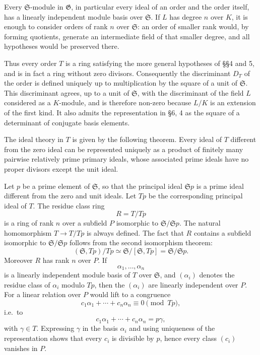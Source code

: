 \documentclass[11pt]{article}
\begin{document}
Every \(\mathfrak S\)-module in \(\mathfrak G\), in particular every
ideal of an order and the order itself, has a linearly independent
module basis over \(\mathfrak S\). If \(L\) has degree \(n\) over \(K\),
it is enough to consider orders of rank \(n\) over \(\mathfrak S\): an
order of smaller rank would, by forming quotients, generate an
intermediate field of that smaller degree, and all hypotheses would be
preserved there.

Thus every order \(T\) is a ring satisfying the more general hypotheses
of §§4 and 5, and is in fact a ring without zero divisors. Consequently
the discriminant \(D_T\) of the order is defined uniquely up to
multiplication by the square of a unit of \(\mathfrak S\). This
discriminant agrees, up to a unit of \(\mathfrak S\), with the
discriminant of the field \(L\) considered as a \(K\)-module, and is
therefore non-zero because \(L/K\) is an extension of the first kind. It
also admits the representation in §6, 4 as the square of a determinant
of conjugate basis elements.

The ideal theory in \(T\) is given by the following theorem. Every ideal
of \(T\) different from the zero ideal can be represented uniquely as a
product of finitely many pairwise relatively prime primary ideals, whose
associated prime ideals have no proper divisors except the unit ideal.

Let \(p\) be a prime element of \(\mathfrak S\), so that the principal
ideal \(\mathfrak S p\) is a prime ideal different from the zero and
unit ideals. Let \(Tp\) be the corresponding principal ideal of \(T\).
The residue class ring \[
  R=T/Tp
\] is a ring of rank \(n\) over a subfield \(P\) isomorphic to
\(\mathfrak S/\mathfrak S p\). The natural homomorphism \(T\to T/Tp\) is
always defined. The fact that \(R\) contains a subfield isomorphic to
\(\mathfrak S/\mathfrak S p\) follows from the second isomorphism
theorem: \[
  (\mathfrak S,Tp)/Tp\simeq
  \mathfrak S/[\mathfrak S,Tp]
  =\mathfrak S/\mathfrak S p.
\] Moreover \(R\) has rank \(n\) over \(P\). If \[
  \alpha_1,
\ldots,
\alpha_n
\] is a linearly independent module basis of \(T\) over \(\mathfrak S\),
and \((\alpha_i)\) denotes the residue class of \(\alpha_i\) modulo
\(Tp\), then the \((\alpha_i)\) are linearly independent over \(P\). For
a linear relation over \(P\) would lift to a congruence \[
  c_1\alpha_1+
\cdots+c_n\alpha_n\equiv0\pmod{Tp},
\] i.e.~to \[
  c_1\alpha_1+
\cdots+c_n\alpha_n=p\gamma,
\] with \(\gamma\in T\). Expressing \(\gamma\) in the basis \(\alpha_i\)
and using uniqueness of the representation shows that every \(c_i\) is
divisible by \(p\), hence every class \((c_i)\) vanishes in \(P\).
\end{document}
